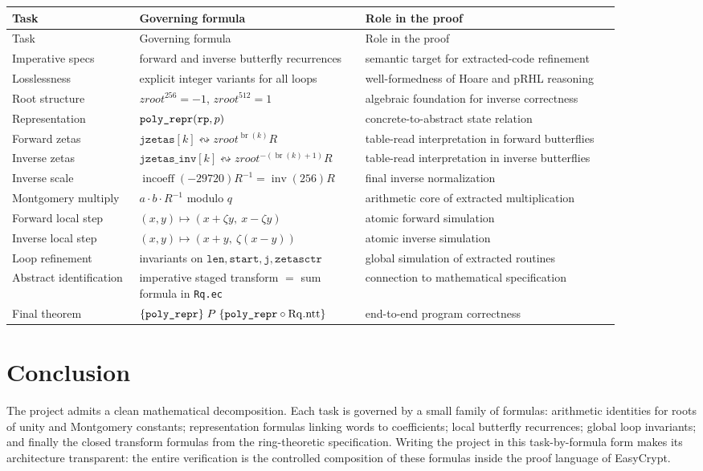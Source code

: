 \documentclass[11pt]{article}
\newcommand{\code}[1]{\text{\texttt{#1}}}
\begin{document}
\begin{center}
\begin{longtable}{p{0.19\linewidth} p{0.31\linewidth} p{0.38\linewidth}}
\toprule
Task & Governing formula & Role in the proof \\
\midrule
\endfirsthead
\toprule
Task & Governing formula & Role in the proof \\
\midrule
\endhead
Imperative specs & forward and inverse butterfly recurrences & semantic target for extracted-code refinement \\
Losslessness & explicit integer variants for all loops & well-formedness of Hoare and pRHL reasoning \\
Root structure & \(zroot^{256}=-1\), \(zroot^{512}=1\) & algebraic foundation for inverse correctness \\
Representation & \(\code{poly\_repr}(\texttt{rp},p)\) & concrete-to-abstract state relation \\
Forward zetas & \(\texttt{jzetas}[k] \leftrightsquigarrow zroot^{\operatorname{br}(k)}R\) & table-read interpretation in forward butterflies \\
Inverse zetas & \(\texttt{jzetas\_inv}[k] \leftrightsquigarrow zroot^{-(\operatorname{br}(k)+1)}R\) & table-read interpretation in inverse butterflies \\
Inverse scale & \(\operatorname{incoeff}(-29720)R^{-1} = \operatorname{inv}(256)R\) & final inverse normalization \\
Montgomery multiply & \(a\cdot b\cdot R^{-1}\) modulo \(q\) & arithmetic core of extracted multiplication \\
Forward local step & \((x,y)\mapsto (x+\zeta y,\ x-\zeta y)\) & atomic forward simulation \\
Inverse local step & \((x,y)\mapsto (x+y,\ \zeta(x-y))\) & atomic inverse simulation \\
Loop refinement & invariants on \(\texttt{len},\texttt{start},\texttt{j},\texttt{zetasctr}\) & global simulation of extracted routines \\
Abstract identification & imperative staged transform \(=\) sum formula in \texttt{Rq.ec} & connection to mathematical specification \\
Final theorem & \(\{\code{poly\_repr}\}\;P\;\{\code{poly\_repr}\circ \mathrm{Rq.ntt}\}\) & end-to-end program correctness \\
\bottomrule
\end{longtable}
\end{center}

\section*{Conclusion}

The project admits a clean mathematical decomposition. Each task is governed by
a small family of formulas: arithmetic identities for roots of unity and
Montgomery constants; representation formulas linking words to coefficients;
local butterfly recurrences; global loop invariants; and finally the closed
transform formulas from the ring-theoretic specification. Writing the project
in this task-by-formula form makes its architecture transparent: the entire
verification is the controlled composition of these formulas inside the proof
language of EasyCrypt.
\end{document}
